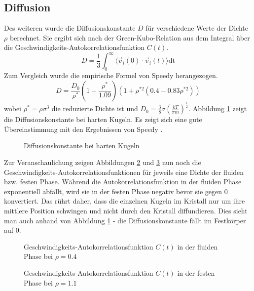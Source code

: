 \subsection{Diffusion}
Des weiteren wurde die Diffusionskonstante $D$ für verschiedene Werte der Dichte $\rho$ berechnet. Sie ergibt sich nach der Green-Kubo-Relation aus dem Integral über die Geschwindigkeits-Autokorrelationsfunktion $C(t)$.
\begin{equation}
D = \frac{1}{3}\int_0^{\infty} \langle \vec{v}_i(0)\cdot \vec{v}_i(t)\rangle \text{dt}
\end{equation}
Zum Vergleich wurde die empirische Formel von Speedy \cite{Speedy1987} herangezogen.
\begin{equation}
D = \frac{D_0}{\rho^*}\left(1-\frac{\rho^*}{1.09}\right)\left(1+\rho^{*2}\left(0.4 - 0.83\rho^{*2}\right)\right)
\end{equation}
wobei $\rho^*= \rho \sigma^3$ die reduzierte Dichte ist und $D_0 = \frac{3}{8} \sigma \left(\frac{kT}{\pi m}\right)^{\frac{1}{2}}$. Abbildung \ref{fig:diffusion} zeigt die Diffusionskonstante bei harten Kugeln. Es zeigt sich eine gute Übereinstimmung mit den Ergebnissen von Speedy \cite{Speedy1987}.
\begin{figure}[H]
 \centering
  \resizebox{0.9\textwidth}{!}{}
 \caption{Diffusionskonstante bei harten Kugeln}
 \label{fig:diffusion}
\end{figure} 
Zur Veranschaulichung zeigen Abbildungen \ref{fig:autocorr-fluid} und \ref{fig:autocorr-solid} nun noch die Geschwindigkeits-Autokorrelationsfunktionen für jeweils eine Dichte der fluiden bzw. festen Phase. Während die Autokorrelationsfunktion in der fluiden Phase exponentiell abfällt, wird sie in der festen Phase negativ bevor sie gegen 0 konvertiert. Das rührt daher, dass die einzelnen Kugeln im Kristall nur um ihre mittlere Position schwingen und nicht durch den Kristall diffundieren. Dies sieht man auch anhand von Abbildung \ref{fig:diffusion} - die Diffusionskonstante fällt im Festkörper auf 0. 

\begin{figure}[H]
 \centering
  \resizebox{0.9\textwidth}{!}{}
 \caption{Geschwindigkeits-Autokorrelationsfunktion $C(t)$ in der fluiden Phase bei $\rho = 0.4$}
 \label{fig:autocorr-fluid}
\end{figure} 

\begin{figure}[H]
 \centering
  \resizebox{0.9\textwidth}{!}{}
 \caption{Geschwindigkeits-Autokorrelationsfunktion $C(t)$ in der festen Phase bei $\rho = 1.1$}
 \label{fig:autocorr-solid}
\end{figure} 
  

